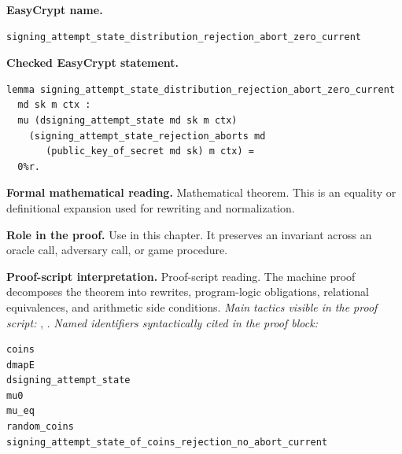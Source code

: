\begin{formaltheorem}
\noindent\textbf{EasyCrypt name.}
\begin{lstlisting}[language=EasyCrypt,basicstyle=\ttfamily\scriptsize]
signing_attempt_state_distribution_rejection_abort_zero_current
\end{lstlisting}
\noindent\textbf{Checked EasyCrypt statement.}
\begin{lstlisting}[language=EasyCrypt,basicstyle=\ttfamily\scriptsize]
lemma signing_attempt_state_distribution_rejection_abort_zero_current
  md sk m ctx :
  mu (dsigning_attempt_state md sk m ctx)
    (signing_attempt_state_rejection_aborts md
       (public_key_of_secret md sk) m ctx) =
  0%r.
\end{lstlisting}
\noindent\textbf{Formal mathematical reading.}
Mathematical theorem. This is an equality or definitional expansion used for rewriting and normalization.

\noindent\textbf{Role in the proof.}
Use in this chapter. It preserves an invariant across an oracle call, adversary call, or game procedure.

\noindent\textbf{Proof-script interpretation.}
Proof-script reading. The machine proof decomposes the theorem into rewrites, program-logic obligations, relational equivalences, and arithmetic side conditions.
\emph{Main tactics visible in the proof script:} , .
\emph{Named identifiers syntactically cited in the proof block:}
\begin{lstlisting}[language=EasyCrypt,basicstyle=\ttfamily\scriptsize]
coins
dmapE
dsigning_attempt_state
mu0
mu_eq
random_coins
signing_attempt_state_of_coins_rejection_no_abort_current
\end{lstlisting}

\end{formaltheorem}

